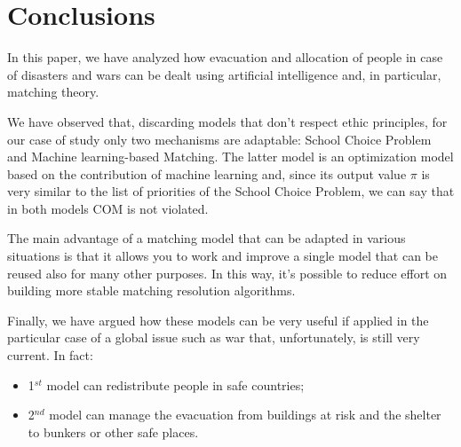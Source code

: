 \section{Conclusions}
In this paper, we have analyzed how evacuation and allocation of people in case of disasters and wars can be dealt using artificial intelligence and, in particular, matching theory.

We have observed that, discarding models that don’t respect ethic principles, for our case of study only two mechanisms are adaptable: School Choice Problem and Machine learning-based Matching. The latter model is an optimization model based on the contribution of machine learning and, since its output value \(\pi\) is very similar to the list of priorities of the School Choice Problem, we can say that in both models COM is not violated.

The main advantage of a matching model that can be adapted in various situations is that it allows you to work and improve a single model that can be reused also for many other purposes. In this way, it’s possible to reduce effort on building more stable matching resolution algorithms.

Finally, we have argued how these models can be very useful if applied in the particular case of a global issue such as war that, unfortunately, is still very current. In fact:
\begin{itemize}
    \item 1\(^{st}\) model can redistribute people in safe countries;
    \item 2\(^{nd}\) model can manage the evacuation from buildings at risk and the shelter to bunkers or other safe places.
\end{itemize}
